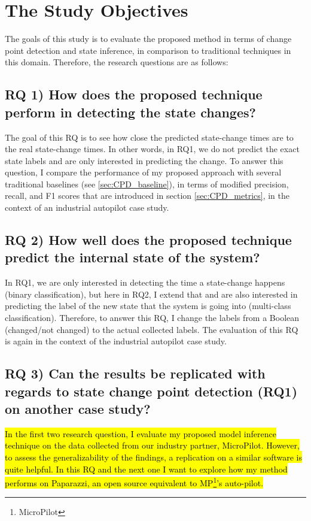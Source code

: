 \section{The Study Objectives}
The goals of this study is to evaluate the proposed method in terms of change point detection and state inference, in comparison to traditional techniques in this domain. Therefore, the research questions are as follows:

\subsection{RQ 1) How does the proposed technique perform in detecting the state changes?}
The goal of this RQ is to see how close the predicted state-change times are to the real state-change times. In other words, in RQ1, we do not predict the exact state labels and are only interested in predicting the change.
To answer this question, I compare the performance of my proposed approach with several traditional baselines (see \ref{sec:CPD_baseline}), in terms of modified precision, recall, and F1 scores that are introduced in section \ref{sec:CPD_metrics}, in the context of an industrial autopilot case study.


\subsection{RQ 2) How well does the proposed technique predict the internal state of the system?}
In RQ1, we are only interested in detecting the time a state-change happens (binary classification), but here in RQ2, I extend that and are also interested in predicting the label of the new state that the system is going into (multi-class classification).  
Therefore, to answer this RQ, I change the labels from a Boolean (changed/not changed) to the actual collected labels. The evaluation of this RQ is again in the context of the industrial autopilot case study.

\subsection{RQ 3) Can the results be replicated with regards to state change point detection (RQ1) on another case study?}
\hl{In the first two research question, I evaluate my proposed model inference technique on the data collected from our industry partner, MicroPilot. However, to assess the generalizability of the findings, a replication on a similar software is quite helpful. 
In this RQ and the next one I want to explore how my method performs on Paparazzi, an open source equivalent to MP\footnote{MicroPilot}'s auto-pilot.}


